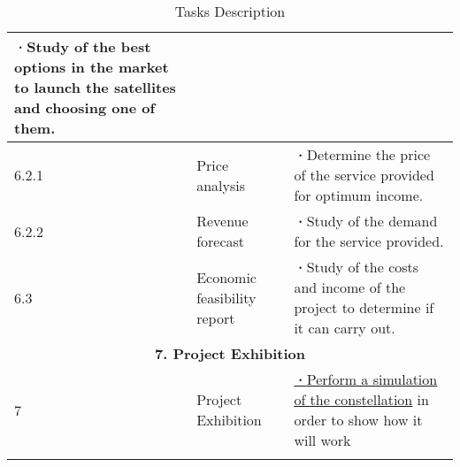 \begin{longtable}{ | p{1.3cm} | p{3cm} | p{11cm} |}
\textbf{·}Study of the best options in the market to launch the satellites and choosing one of them.\\ 
\hline
6.2.1 & Price analysis &   
\textbf{·}Determine the price of the service provided for optimum income.\\ 
\hline
6.2.2 & Revenue forecast & 
\textbf{·}Study of the demand for the service provided.\\ 
\hline
6.3 & Economic feasibility report & 
\textbf{·}Study of the costs and income of the project to determine if it can carry out.\\ 
 \hline
 \multicolumn{3}{|c|}{\textbf{7. Project Exhibition}} \\ \hline
7 & Project Exhibition & 

\underline{\textbf{·}Perform a simulation of the constellation} in order to show how it will work \\ \hline
\caption{Tasks Description} \\
\end{longtable}